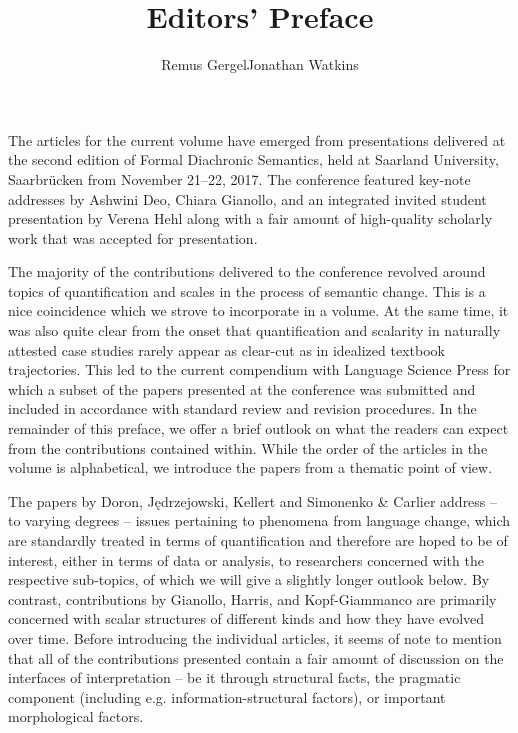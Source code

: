 \documentclass[output=paper]{langsci/langscibook}
\title{Editors' Preface}
\author{Remus Gergel\affiliation{Universität des Saarlandes}\lastand Jonathan Watkins\affiliation{Universität des Saarlandes}}
\begin{document}
\maketitle

The articles for the current volume have emerged from presentations delivered at the second edition of Formal Diachronic Semantics, held at Saarland University, Saarbrücken from November 21--22, 2017. The conference featured key-note addresses by Ashwini Deo, Chiara Gianollo, and an integrated invited student presentation by Verena Hehl along with a fair amount of high-quality scholarly work that was accepted for presentation.

The majority of the contributions delivered to the conference revolved around topics of quantification and scales in the process of semantic change. This is a nice coincidence which we strove to incorporate in a volume. At the same time, it was also quite clear from the onset that quantification and scalarity in naturally attested case studies rarely appear as clear-cut as in idealized textbook trajectories. This led to the current compendium with Language Science Press for which a subset of the papers presented at the conference was submitted and included in accordance with standard review and revision procedures. In the remainder of this preface, we offer a brief outlook on what the readers can expect from the contributions contained within. While the order of the articles in the volume is alphabetical, we introduce the papers from a thematic point of view.

The papers by Doron, Jędrzejowski, Kellert and Simonenko \& Carlier address – to varying degrees – issues pertaining to phenomena from language change, which are standardly treated in terms of quantification and therefore are hoped to be of interest, either in terms of data or analysis, to researchers concerned with the respective sub-topics, of which we will give a slightly longer outlook below. By contrast, contributions by Gianollo, Harris, and Kopf-Giammanco are primarily concerned with scalar structures of different kinds and how they have evolved over time. Before introducing the individual articles, it seems of note to mention that all of the contributions presented contain a fair amount of discussion on the interfaces of interpretation – be it through structural facts, the pragmatic component (including e.g. information-structural factors), or important morphological factors.
\end{document}
